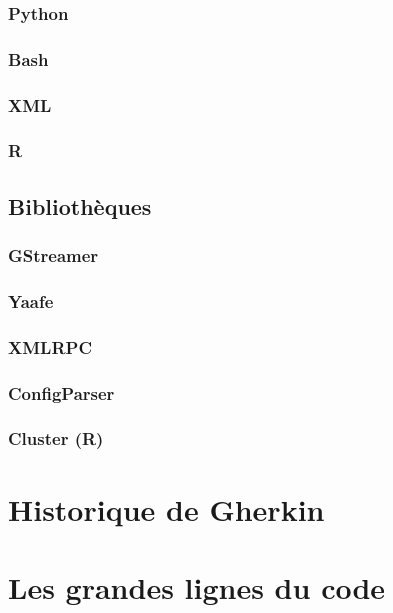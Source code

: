 \documentclass{report}
\begin{document}
\subsection{Python}

\subsection{Bash}

\subsection{XML}

\subsection{R}

\section{Bibliothèques}

\subsection{GStreamer}

\subsection{Yaafe}

\subsection{XMLRPC}

\subsection{ConfigParser}

\subsection{Cluster (R)}

\chapter{Historique de Gherkin}


\chapter{Les grandes lignes du code}
\end{document}
